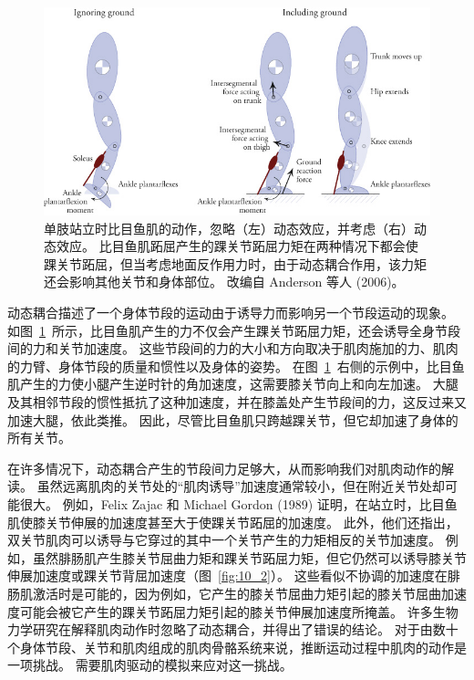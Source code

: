 \begin{figure}[!htb]
	\centering
	\includegraphics[width=1.0\linewidth]{chap10/10_1}
	\caption{单肢站立时比目鱼肌的动作，忽略（左）动态效应，并考虑（右）动态效应。
		比目鱼肌跖屈产生的踝关节跖屈力矩在两种情况下都会使踝关节跖屈，但当考虑地面反作用力时，由于动态耦合作用，该力矩还会影响其他关节和身体部位。
		改编自 Anderson 等人 (2006)。 \label{fig:10_1}}
\end{figure}


动态耦合描述了一个身体节段的运动由于诱导力而影响另一个节段运动的现象。
如图~\ref{fig:10_1}~所示，比目鱼肌产生的力不仅会产生踝关节跖屈力矩，还会诱导全身节段间的力和关节加速度。
这些节段间的力的大小和方向取决于肌肉施加的力、肌肉的力臂、身体节段的质量和惯性以及身体的姿势。
在图~\ref{fig:10_1}~右侧的示例中，比目鱼肌产生的力使小腿产生逆时针的角加速度，这需要膝关节向上和向左加速。
大腿及其相邻节段的惯性抵抗了这种加速度，并在膝盖处产生节段间的力，这反过来又加速大腿，依此类推。
因此，尽管比目鱼肌只跨越踝关节，但它却加速了身体的所有关节。


在许多情况下，动态耦合产生的节段间力足够大，从而影响我们对肌肉动作的解读。
虽然远离肌肉的关节处的“肌肉诱导”加速度通常较小，但在附近关节处却可能很大。
例如，Felix Zajac 和 Michael Gordon (1989) 证明，在站立时，比目鱼肌使膝关节伸展的加速度甚至大于使踝关节跖屈的加速度。
此外，他们还指出，双关节肌肉可以诱导与它穿过的其中一个关节产生的力矩相反的关节加速度。
例如，虽然腓肠肌产生膝关节屈曲力矩和踝关节跖屈力矩，但它仍然可以诱导膝关节伸展加速度或踝关节背屈加速度（图~\ref{fig:10_2}）。
这些看似不协调的加速度在腓肠肌激活时是可能的，因为例如，它产生的膝关节屈曲力矩引起的膝关节屈曲加速度可能会被它产生的踝关节跖屈力矩引起的膝关节伸展加速度所掩盖。
许多生物力学研究在解释肌肉动作时忽略了动态耦合，并得出了错误的结论。
对于由数十个身体节段、关节和肌肉组成的肌肉骨骼系统来说，推断运动过程中肌肉的动作是一项挑战。
需要肌肉驱动的模拟来应对这一挑战。


